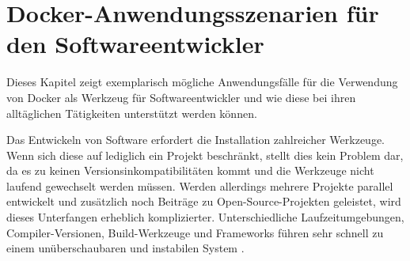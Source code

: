 \chapter{Docker-Anwendungsszenarien für den Softwareentwickler}
\label{cha:szenarien}
Dieses Kapitel zeigt exemplarisch mögliche Anwendungsfälle für die Verwendung von Docker als Werkzeug für Softwareentwickler und wie diese bei ihren alltäglichen Tätigkeiten unterstützt werden können.

Das Entwickeln von Software erfordert die Installation zahlreicher Werkzeuge.
Wenn sich diese auf lediglich ein Projekt beschränkt, stellt dies kein Problem dar, da es zu keinen Versionsinkompatibilitäten kommt und die Werkzeuge nicht laufend gewechselt werden müssen.
Werden allerdings mehrere Projekte parallel entwickelt und zusätzlich noch Beiträge zu Open-Source-Projekten geleistet, wird dieses Unterfangen erheblich komplizierter.
Unterschiedliche Laufzeitumgebungen, Compiler-Versionen, Build-Werkzeuge und Frameworks führen sehr schnell zu einem unüberschaubaren und instabilen System \autocite{smashing-local-devenv-docker:online}.

